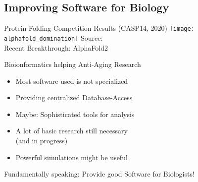 \subsection{Improving Software for Biology}

\begin{frame}[c]{Protein Folding Competition Results (CASP14, 2020)}
    \scriptsize
    \texttt{[image: alphafold\_domination]}
    Source: \cite{jameswag39:online} \\
    \normalsize
    Recent Breakthrough: AlphaFold2 \cite{jumper2021alphafold} \\
\end{frame}


\begin{frame}[c]{Bioionformatics helping Anti-Aging Research}
    \large
    \begin{itemize}[<+(1)->]
        \item Most software used is not specialized
        \item Providing centralized Database-Access
        \item Maybe: Sophisticated tools for analysis
        \item A lot of basic research still necessary \\(and in progress)
        \item Powerful simulations might be useful
    \end{itemize}
    \pause
    Fundamentally speaking: Provide good Software for Biologists!
\end{frame}




